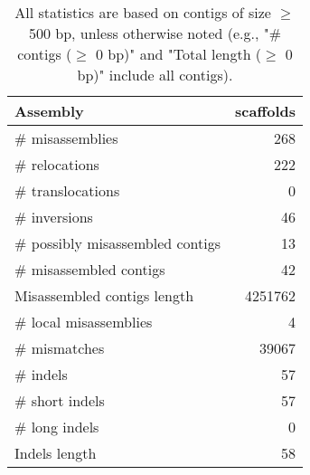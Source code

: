 \documentclass[12pt,a4paper]{article}
\begin{document}
\begin{table}[ht]
\begin{center}
\caption{All statistics are based on contigs of size $\geq$ 500 bp, unless otherwise noted (e.g., "\# contigs ($\geq$ 0 bp)" and "Total length ($\geq$ 0 bp)" include all contigs).}
\begin{tabular}{|l*{1}{|r}|}
\hline
Assembly & scaffolds \\ \hline
\# misassemblies & 268 \\ \hline
\hspace{5mm}\# relocations & 222 \\ \hline
\hspace{5mm}\# translocations & 0 \\ \hline
\hspace{5mm}\# inversions & 46 \\ \hline
\# possibly misassembled contigs & 13 \\ \hline
\# misassembled contigs & 42 \\ \hline
Misassembled contigs length & 4251762 \\ \hline
\# local misassemblies & 4 \\ \hline
\# mismatches & 39067 \\ \hline
\# indels & 57 \\ \hline
\hspace{5mm}\# short indels & 57 \\ \hline
\hspace{5mm}\# long indels & 0 \\ \hline
Indels length & 58 \\ \hline
\end{tabular}
\end{center}
\end{table}
\end{document}
